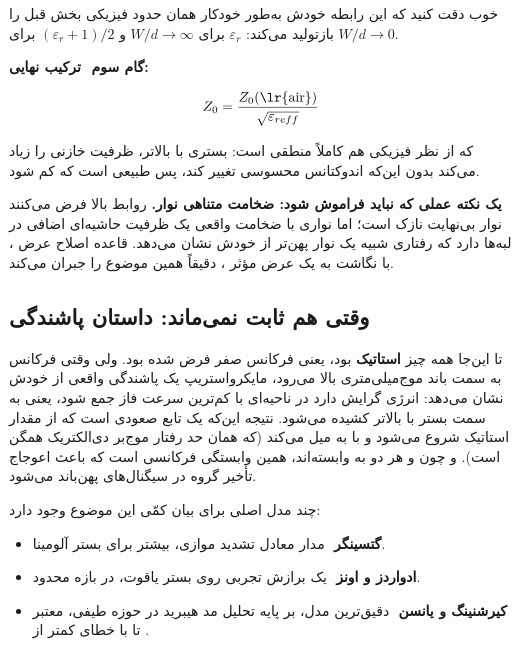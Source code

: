 \documentclass[12pt]{article}
\begin{document}
	خوب دقت کنید که این رابطه خودش به‌طور خودکار همان حدود فیزیکی بخش قبل را بازتولید می‌کند: $\varepsilon_r$ برای $W/d\to\infty$ و $(\varepsilon_r+1)/2$ برای $W/d\to0$.
	
	\textbf{گام سوم ‌ ترکیب نهایی:}
	
	\begin{equation}
		Z_0 = \frac{Z_0(\text{\lr{air}})}{\sqrt{\varepsilon_{reff}}}
	\end{equation}
	
	که از نظر فیزیکی هم کاملاً منطقی است: بستری با  بالاتر، ظرفیت خازنی را زیاد می‌کند بدون این‌که اندوکتانس محسوسی تغییر کند، پس طبیعی است که  کم شود.
	
	\textbf{یک نکته عملی که نباید فراموش شود: ضخامت متناهی نوار.} روابط بالا فرض می‌کنند نوار بی‌نهایت نازک است؛ اما نواری با ضخامت واقعی  یک ظرفیت حاشیه‌ای اضافی در لبه‌ها دارد که رفتاری شبیه یک نوار پهن‌تر از خودش نشان می‌دهد. قاعده اصلاح عرض ، با نگاشت  به یک عرض مؤثر ، دقیقاً همین موضوع را جبران می‌کند.
	
	\subsection{وقتی \texorpdfstring{}{Z0} هم ثابت نمی‌ماند: داستان پاشندگی}
	
	تا این‌جا همه چیز \textbf{استاتیک} بود، یعنی فرکانس صفر فرض شده بود. ولی وقتی فرکانس به سمت باند موج‌میلی‌متری بالا می‌رود، مایکرواستریپ یک پاشندگی واقعی از خودش نشان می‌دهد: انرژی گرایش دارد در ناحیه‌ای با کم‌ترین سرعت فاز جمع شود، یعنی به سمت بستر با  بالاتر کشیده می‌شود. نتیجه این‌که  یک تابع صعودی است که از مقدار استاتیک شروع می‌شود و با  به  میل می‌کند (که همان حد رفتار موج‌بر دی‌الکتریک همگن است). و چون  و  هر دو به  وابسته‌اند، همین وابستگی فرکانسی است که باعث اعوجاج تأخیر گروه در سیگنال‌های پهن‌باند می‌شود.
	
	چند مدل اصلی برای بیان کمّی این موضوع وجود دارد:
	
	\begin{itemize}
		\item \textbf{گتسینگر } ‌ مدار معادل تشدید  موازی، بیشتر برای بستر آلومینا.
		\item \textbf{ادواردز و اونز } ‌ یک برازش تجربی روی بستر یاقوت، در بازه محدود.
		\item \textbf{کیرشنینگ و یانسن } ‌ دقیق‌ترین مدل، بر پایه تحلیل مد هیبرید در حوزه طیفی، معتبر تا  با خطای کمتر از .
	\end{itemize}
	
\end{document}
